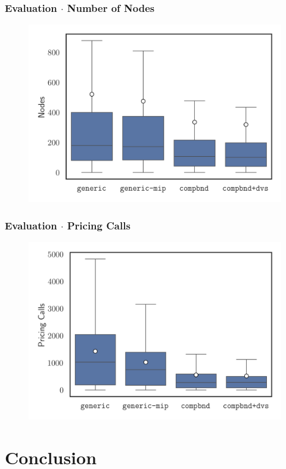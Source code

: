 \documentclass[compress,beamer,aspectratio=169,english,usenames,dvipsnames]{beamer}
\begin{document}
\begin{frame}
\frametitle{Evaluation $\cdot$ Number of Nodes}
\centering
\begin{figure}
\includegraphics[height=0.85\textheight]{graphics/slides/general/MostFractional/nodes.png}
\end{figure}
\end{frame}

\begin{frame}
\frametitle{Evaluation $\cdot$ Pricing Calls}
\centering
\begin{figure}
\includegraphics[height=0.85\textheight]{graphics/slides/general/MostFractional/pricing_calls.png}
\end{figure}
\end{frame}

\section{Conclusion}
\end{document}
